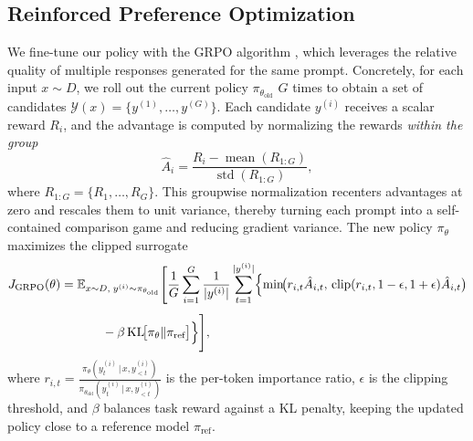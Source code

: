 \subsection{Reinforced Preference Optimization} \label{sec:optimization}
We fine-tune our policy with the GRPO algorithm \citep{deepseekmath,deepseek}, which leverages the relative quality of multiple responses generated for the same prompt. Concretely, for each input $x\!\sim\!D$, we roll out the current policy $\pi_{\theta_{\text{old}}}$ $G$ times to obtain a set of candidates $\mathcal{Y}(x)=\{y^{(1)},\dots,y^{(G)}\}$.  Each candidate $y^{(i)}$ receives a scalar reward $R_i$, and the advantage is computed by normalizing the rewards \emph{within the group}
\begin{equation}
    \hat{A}_i=\frac{R_i-\operatorname{mean}(R_{1:G})}{\operatorname{std}(R_{1:G})},
    \label{eq:grpo_adv}
\end{equation}
where $R_{1:G}=\{R_1,\dots,R_G\}$. This groupwise normalization recenters advantages at zero and rescales them to unit variance, thereby turning each prompt into a self-contained comparison game and reducing gradient variance.  The new policy $\pi_\theta$ maximizes the clipped surrogate
\begin{equation}
\begin{aligned}
J_{\text{GRPO}}(\theta)=\;
&\mathbb{E}_{x\sim D,\; y^{(i)}\sim\pi_{\theta_{\text{old}}}}
\Biggl[
\frac{1}{G}\sum_{i=1}^{G}\frac{1}{|y^{(i)}|}
\sum_{t=1}^{|y^{(i)}|}
\Bigl\{
\min\!\bigl(r_{i,t}\hat{A}_{i,t},\,
\operatorname{clip}(r_{i,t},1-\epsilon,1+\epsilon)\hat{A}_{i,t}\bigr)
\\[4pt]
&\qquad
-\beta\,\mathrm{KL}\!\bigl[\pi_\theta\|\pi_{\text{ref}}\bigr]
\Bigr\}
\Biggr],
\end{aligned}
\label{eq:grpo_obj}
\end{equation}
where 
$r_{i,t}=
\tfrac{\pi_\theta(y^{(i)}_t\,|\,x,y^{(i)}_{<t})}
      {\pi_{\theta_{\text{old}}}(y^{(i)}_t\,|\,x,y^{(i)}_{<t})}$
is the per-token importance ratio, $\epsilon$ is the clipping threshold, and $\beta$ balances task reward against a KL penalty, keeping the updated policy close to a reference model $\pi_{\text{ref}}$.

